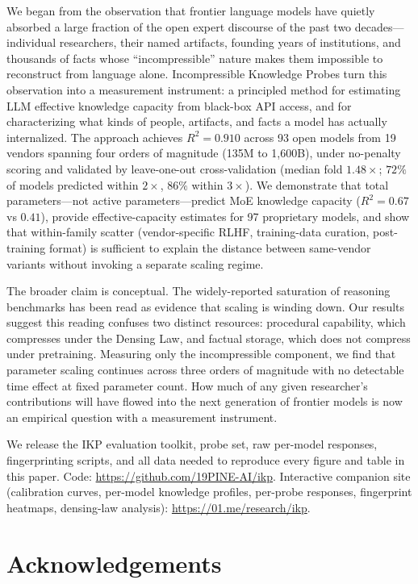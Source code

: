 \documentclass[11pt]{article}
\begin{document}
We began from the observation that frontier language models have quietly absorbed a large fraction of the open expert discourse of the past two decades---individual researchers, their named artifacts, founding years of institutions, and thousands of facts whose ``incompressible'' nature makes them impossible to reconstruct from language alone. Incompressible Knowledge Probes turn this observation into a measurement instrument: a principled method for estimating LLM effective knowledge capacity from black-box API access, and for characterizing what kinds of people, artifacts, and facts a model has actually internalized. The approach achieves $R^2 = 0.910$ across 93 open models from 19 vendors spanning four orders of magnitude (135M to 1{,}600B), under no-penalty scoring and validated by leave-one-out cross-validation (median fold $1.48\times$; $72\%$ of models predicted within $2\times$, $86\%$ within $3\times$). We demonstrate that total parameters---not active parameters---predict MoE knowledge capacity ($R^2 = 0.67$ vs $0.41$), provide effective-capacity estimates for 97 proprietary models, and show that within-family scatter (vendor-specific RLHF, training-data curation, post-training format) is sufficient to explain the distance between same-vendor variants without invoking a separate scaling regime.

The broader claim is conceptual. The widely-reported saturation of reasoning benchmarks has been read as evidence that scaling is winding down. Our results suggest this reading confuses two distinct resources: procedural capability, which compresses under the Densing Law, and factual storage, which does not compress under pretraining. Measuring only the incompressible component, we find that parameter scaling continues across three orders of magnitude with no detectable time effect at fixed parameter count. How much of any given researcher's contributions will have flowed into the next generation of frontier models is now an empirical question with a measurement instrument.

We release the IKP evaluation toolkit, probe set, raw per-model responses, fingerprinting scripts, and all data needed to reproduce every figure and table in this paper. Code: \url{https://github.com/19PINE-AI/ikp}. Interactive companion site (calibration curves, per-model knowledge profiles, per-probe responses, fingerprint heatmaps, densing-law analysis): \url{https://01.me/research/ikp}.

\section*{Acknowledgements}
\end{document}
